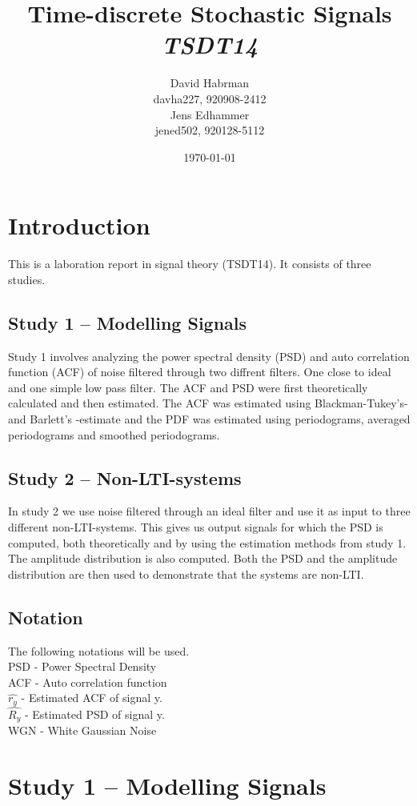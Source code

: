 \documentclass[10pt]{article}
\title{Time-discrete Stochastic Signals\\
\emph{TSDT14}}
\author{David Habrman \\ davha227, 920908-2412\\
Jens Edhammer \\ jened502, 920128-5112 }
\date{\today}
\begin{document}
\maketitle

\section{Introduction}
This is a laboration report in signal theory (TSDT14). It consists of three studies.

\subsection{Study 1 – Modelling Signals}
Study 1 involves analyzing the power spectral density (PSD) and auto correlation function (ACF)
of noise filtered through two diffrent filters. One close to ideal and one simple low pass filter.
The ACF and PSD were first theoretically calculated and then estimated.
The ACF was estimated using Blackman-Tukey's- and Barlett's -estimate and the
PDF was estimated using periodograms, averaged periodograms and smoothed periodograms.

\subsection{Study 2 – Non-LTI-systems}
In study 2 we use noise filtered through an ideal filter and use it as input to three different non-LTI-systems.
This gives us output signals for which the PSD is computed, both theoretically and by using the estimation methods
from study 1. The  amplitude distribution is also computed. Both the PSD and the  amplitude distribution are then used
to demonstrate that the systems are non-LTI.



\subsection{Notation}
The following notations will be used. \\
PSD - Power Spectral Density \\
ACF - Auto correlation function \\
$\hat{r_y}$ - Estimated ACF of signal y. \\
$\hat{R_y}$ - Estimated PSD of signal y. \\
WGN - White Gaussian Noise

\section{Study 1 – Modelling Signals}
\end{document}
